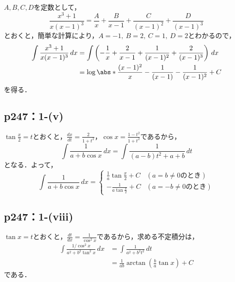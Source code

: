 \documentclass[uplatex,dvipdfmx,a4paper,10pt,fleqn]{jsarticle}
\begin{document}
\begin{tleftbar}
    $A,B,C,D$を定数として，
    \[
        \frac{x^3+1}{x(x-1)^3} = \frac{A}{x}+\frac{B}{x-1}+\frac{C}{(x-1)^2}+\frac{D}{(x-1)^3}
    \]
    とおくと，簡単な計算により，$A=-1,~B=2,~C=1,~D=2$とわかるので，
    \begin{align*}
        \int \frac{x^3+1}{x(x-1)^3} \, dx & = \int \left (-\frac{1}{x}+\frac{2}{x-1}+\frac{1}{(x-1)^2}+\frac{2}{(x-1)^3} \right ) \, dx \\
        & = \log \abs*{\frac{(x-1)^2}{x}} -\frac{1}{(x-1)}-\frac{1}{(x-1)^2}+ C
    \end{align*}
    を得る．
\end{tleftbar}

\subsection*{p247：1-(v)}


\begin{tleftbar}
    $\tan \frac{x}{2}=t$とおくと，$\frac{dx}{dt}=\frac{2}{1+t^2}$，$\cos x = \frac{1-t^2}{1+t^2}$であるから，
    \[
        \int \frac{1}{a+b \cos x} \, dx  = \int \frac{1}{(a-b)t^2 +a+b} \, dt
    \]
    となる．よって，
    \[
        \int \frac{1}{a+b\cos x} \, dx =
        \begin{cases}
            \frac{1}{a} \tan \frac{x}{2}+ C &(\text{$a=b \ne 0$のとき})\\
            -\frac{1}{a \tan \frac{x}{2}}+ C&(\text{$a=-b\ne 0$のとき})
        \end{cases}
    \]
    \end{tleftbar}


\subsection*{p247：1-(viii)}



\begin{tleftbar}
    $\tan x = t$とおくと，$\frac{dt}{dx}= \frac{1}{\cos ^2 x}$であるから，求める不定積分は，
    \begin{align*} 
        \int \frac{1/\cos ^2 x}{a^2 + b^2 \tan ^2 x} \, dx & = \int \frac{1}{a^2+b^2 t^2} \, dt \\
        & = \frac{1}{ab} \arctan \left (\frac{b}{a} \tan x \right)+ C
    \end{align*}
    である．
\end{tleftbar}
\end{document}
